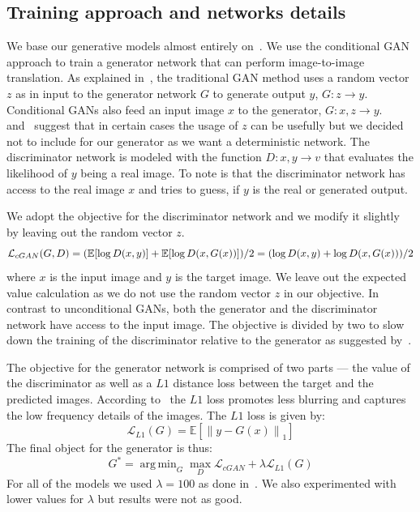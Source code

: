 \documentclass{llncs}
\DeclareMathOperator*{\argminA}{arg\,min}
\begin{document}
\subsection{Training approach and networks details}
We base our generative models almost entirely on~\cite{pix2pix}. We use the conditional GAN approach to train a generator network that can perform image-to-image translation. As explained in~\cite{pix2pix}, the traditional GAN method uses a random vector $z$ as in input to the generator network $G$ to generate output $y$, $G:z \rightarrow y$. Conditional GANs also feed an input image $x$ to the generator, $G: x,z \rightarrow y$.~\cite{pix2pix} and~\cite{wang2016} suggest that in certain cases the usage of $z$ can be usefully but we decided not to include for our generator as we want a deterministic network. The discriminator network is modeled with the function $D:x,y \rightarrow v$ that evaluates the likelihood of $y$ being a real image. To note is that the discriminator network has access to the real image $x$ and tries to guess, if $y$ is the real or generated output.

We adopt the objective for the discriminator network and we modify it slightly by leaving out the random vector $z$.
\begin{equation}
  \mathcal{L}_{cGAN} (G, D) = (\mathbb{E}[\log D (x,y)] + \mathbb{E}[\log D (x, G(x))])/2 \\
  = (\log D (x,y) + \log D (x, G(x)))/2
\end{equation}
where $x$ is the input image and $y$ is the target image. We leave out the expected value calculation as we do not use the random vector $z$ in our objective. In contrast to unconditional GANs, both the generator and the discriminator network have access to the input image. The objective is divided by two to slow down the training of the discriminator relative to the generator as suggested by~\cite{pix2pix}.

The objective for the generator network is comprised of two parts --- the value of the discriminator as well as a $L1$ distance loss between the target and the predicted images. According to~\cite{pix2pix} the $L1$ loss promotes less blurring and captures the low frequency details of the images. The $L1$ loss is given by:
\begin{equation}
\mathcal{L}_{L1} (G) = \mathbb{E}[\left\lVert y - G(x)\right\rVert_1]
\end{equation}
The final object for the generator is thus:
\begin{equation}
G^* = \argminA_G \max_D \mathcal{L}_{cGAN}  + \lambda \mathcal{L}_{L1} (G)
\end{equation}
For all of the models we used $\lambda = 100$ as done in~\cite{pix2pix}. We also experimented with lower values for $\lambda$ but results were not as good.
\end{document}
